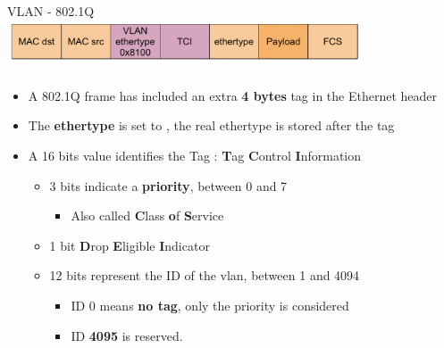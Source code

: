 \begin{frame}{VLAN - 802.1Q}
	\includegraphics[width=0.8\textwidth]{slides/networking-stack-overview/ethernet_frame_vlan.pdf}

	\begin{itemize}
		\item A 802.1Q frame has included an extra \textbf{4 bytes} tag in the Ethernet header
		\item The \textbf{ethertype} is set to , the real ethertype is stored after the tag
		\item A 16 bits value identifies the Tag : \textbf{T}ag \textbf{C}ontrol \textbf{I}nformation
			\begin{itemize}
				\item 3 bits indicate a \textbf{priority}, between 0 and 7
					\begin{itemize}
						\item Also called \textbf{C}lass \textbf{o}f \textbf{S}ervice
					\end{itemize}
				\item 1 bit \textbf{D}rop \textbf{E}ligible \textbf{I}ndicator
				\item 12 bits represent the ID of the vlan, between 1 and 4094
					\begin{itemize}
						\item ID 0 means \textbf{no tag}, only the priority is considered
						\item ID \textbf{4095} is reserved.
					\end{itemize}
			\end{itemize}
	\end{itemize}
\end{frame}

